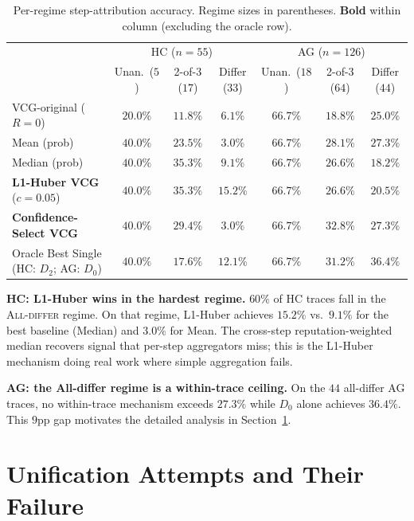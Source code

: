 \documentclass[11pt]{article}
\begin{document}
\begin{table}[h]
\centering
\footnotesize
\setlength{\tabcolsep}{4pt}
\caption{Per-regime step-attribution accuracy. Regime sizes in parentheses.
\textbf{Bold} within column (excluding the oracle row).}
\label{tab:regime}
\begin{tabular}{l|ccc|ccc}
\toprule
& \multicolumn{3}{c|}{HC ($n = 55$)} & \multicolumn{3}{c}{AG ($n = 126$)} \\
& Unan.\ ($5$) & 2-of-3 ($17$) & Differ ($33$)
& Unan.\ ($18$) & 2-of-3 ($64$) & Differ ($44$) \\
\midrule
VCG-original ($R{=}0$)              & $20.0\%$ & $11.8\%$ & $6.1\%$  & $66.7\%$ & $18.8\%$ & $25.0\%$ \\
Mean (prob)                          & $\mathbf{40.0\%}$ & $23.5\%$ & $3.0\%$  & $\mathbf{66.7\%}$ & $28.1\%$ & $27.3\%$ \\
Median (prob)                        & $\mathbf{40.0\%}$ & $35.3\%$ & $9.1\%$  & $\mathbf{66.7\%}$ & $26.6\%$ & $18.2\%$ \\
\textbf{L1-Huber VCG} ($c=0.05$)     & $\mathbf{40.0\%}$ & $\mathbf{35.3\%}$ & $\mathbf{15.2\%}$ & $\mathbf{66.7\%}$ & $26.6\%$ & $20.5\%$ \\
\textbf{Confidence-Select VCG}        & $\mathbf{40.0\%}$ & $29.4\%$ & $3.0\%$  & $\mathbf{66.7\%}$ & $\mathbf{32.8\%}$ & $27.3\%$ \\
\midrule
Oracle Best Single (HC: $D_2$; AG: $D_0$)
                                       & $40.0\%$ & $17.6\%$ & $12.1\%$ & $66.7\%$ & $31.2\%$ & $36.4\%$ \\
\bottomrule
\end{tabular}
\end{table}

\textbf{HC: L1-Huber wins in the hardest regime.}
$60\%$ of HC traces fall in the \textsc{All-differ} regime. On that
regime, L1-Huber achieves $15.2\%$ vs.\ $9.1\%$ for the best baseline
(Median) and $3.0\%$ for Mean. The cross-step reputation-weighted median
recovers signal that per-step aggregators miss; this is the L1-Huber
mechanism doing real work where simple aggregation fails.

\textbf{AG: the All-differ regime is a within-trace ceiling.} On the
$44$ all-differ AG traces, no within-trace mechanism exceeds $27.3\%$
while $D_0$ alone achieves $36.4\%$. This $9$pp gap motivates the
detailed analysis in Section~\ref{sec:unification}.

\section{Unification Attempts and Their Failure}
\label{sec:unification}
\end{document}
